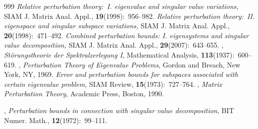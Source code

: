 \documentclass[11pt,a4paper]{article}
\numberwithin{equation}{section}
\begin{document}
\begin{thebibliography}{999}
%
 {\it Relative perturbation theory:~I. eigenvalue and singular value variations,} SIAM J. Matrix Anal. Appl., {\bf 19}(1998):~956--982.
%
 {\it Relative perturbation theory:~II. eigenspace and singular subspace variations,} SIAM J. Matrix Anal. Appl., {\bf 20}(1998):~471--492.
%
 {\it Combined perturbation bounds: I. eigensystems and singular value decomposition,} SIAM J. Matrix Anal. Appl., {\bf 29}(2007):~643--655.
%
, {\it St\"{o}rungstheorie der {S}pektralzerlegung I}, Mathematical
Analysis, {\bf 113}(1937):~600--619.
%
, {\it Perturbation Theory of Eigenvalue Problems}, Gordon and Breach, New York, NY, 1969.
%
 {\it Error and perturbation bounds for subspaces associated with certain eigenvalue problem,} SIAM Review, {\bf 15}(1973):~727--764.
%
, {\it Matrix Perturbation Theory}, Academic Press, Boston, 1990.
%
%

%
, {\it Perturbation bounds in connection with singular value decomposition}, BIT Numer. Math., {\bf 12}(1972):~99--111.
\end{thebibliography}
\end{document}
